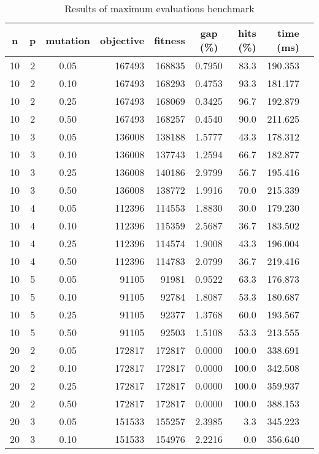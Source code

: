 \begin{table}
\caption{Results of maximum evaluations benchmark}
\label{tb:evals_benchmark}
\begin{center}
\begin{tabular}{|c|c|c|r|r|c|r|r|r|}
\hline
n & p & mutation & objective & fitness & gap (\%) & hits (\%) & time (ms) \\
\hline
10 & 2 & 0.05 & 167493 & 168835 & 0.7950 & 83.3 & 190.353 \\
10 & 2 & 0.10 & 167493 & 168293 & 0.4753 & 93.3 & 181.177 \\
10 & 2 & 0.25 & 167493 & 168069 & 0.3425 & 96.7 & 192.879 \\
10 & 2 & 0.50 & 167493 & 168257 & 0.4540 & 90.0 & 211.625 \\
10 & 3 & 0.05 & 136008 & 138188 & 1.5777 & 43.3 & 178.312 \\
10 & 3 & 0.10 & 136008 & 137743 & 1.2594 & 66.7 & 182.877 \\
10 & 3 & 0.25 & 136008 & 140186 & 2.9799 & 56.7 & 195.416 \\
10 & 3 & 0.50 & 136008 & 138772 & 1.9916 & 70.0 & 215.339 \\
10 & 4 & 0.05 & 112396 & 114553 & 1.8830 & 30.0 & 179.230 \\
10 & 4 & 0.10 & 112396 & 115359 & 2.5687 & 36.7 & 183.502 \\
10 & 4 & 0.25 & 112396 & 114574 & 1.9008 & 43.3 & 196.004 \\
10 & 4 & 0.50 & 112396 & 114783 & 2.0799 & 36.7 & 219.416 \\
10 & 5 & 0.05 & 91105 & 91981 & 0.9522 & 63.3 & 176.873 \\
10 & 5 & 0.10 & 91105 & 92784 & 1.8087 & 53.3 & 180.687 \\
10 & 5 & 0.25 & 91105 & 92377 & 1.3768 & 60.0 & 193.567 \\
10 & 5 & 0.50 & 91105 & 92503 & 1.5108 & 53.3 & 213.555 \\
20 & 2 & 0.05 & 172817 & 172817 & 0.0000 & 100.0 & 338.691 \\
20 & 2 & 0.10 & 172817 & 172817 & 0.0000 & 100.0 & 342.508 \\
20 & 2 & 0.25 & 172817 & 172817 & 0.0000 & 100.0 & 359.937 \\
20 & 2 & 0.50 & 172817 & 172817 & 0.0000 & 100.0 & 388.153 \\
20 & 3 & 0.05 & 151533 & 155257 & 2.3985 & 3.3 & 345.223 \\
20 & 3 & 0.10 & 151533 & 154976 & 2.2216 & 0.0 & 356.640 \\

\end{tabular}
\end{center}
\end{table}
